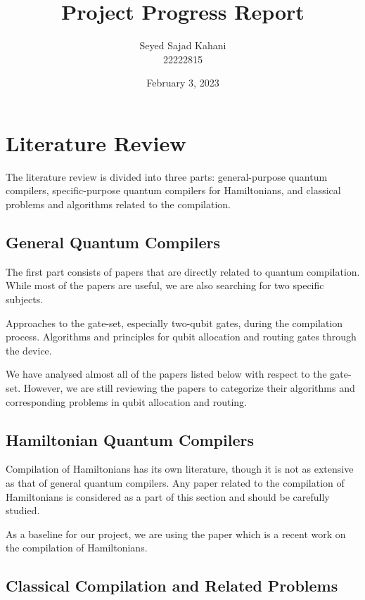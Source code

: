 \documentclass{article}
\title{Project Progress Report}
\author{Seyed Sajad Kahani \\ 22222815}
\date{February 3, 2023}
\begin{document}
\maketitle

\nocite{*}

\section{Literature Review}

The literature review is divided into three parts: general-purpose quantum compilers, specific-purpose quantum compilers for Hamiltonians, and classical problems and algorithms related to the compilation.

\subsection{General Quantum Compilers}

The first part consists of papers that are directly related to quantum compilation. While most of the papers are useful, we are also searching for two specific subjects.

Approaches to the gate-set, especially two-qubit gates, during the compilation process.
Algorithms and principles for qubit allocation and routing gates through the device.

We have analysed almost all of the papers listed below with respect to the gate-set. However, we are still reviewing the papers to categorize their algorithms and corresponding problems in qubit allocation and routing.

\printbibliography[heading=none,keyword=general]

\subsection{Hamiltonian Quantum Compilers}

Compilation of Hamiltonians has its own literature, though  it is not as extensive as that of general quantum compilers. Any paper related to the compilation of Hamiltonians is considered as a part of this section and should be carefully studied.


As a baseline for our project, we are using the paper \cite{lao2021} which is a recent work on the compilation of Hamiltonians.

\printbibliography[heading=none,keyword=hamiltonian]

\subsection{Classical Compilation and Related Problems}
\end{document}
